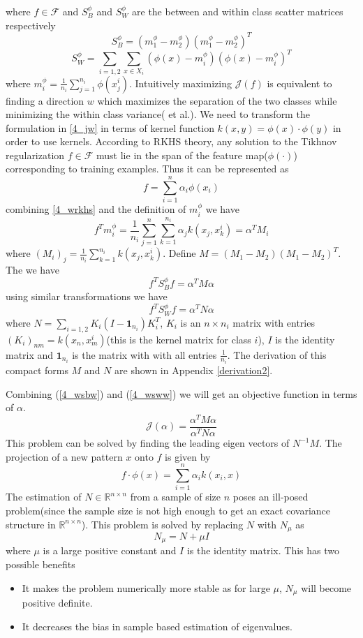 where $f \in \mathcal{F}$ and $S_B^{\phi}$ and $S_W^{\phi}$ are the between and within class scatter matrices respectively
\[ S_B^{\phi} = (m_1^{\phi} - m_2^{\phi})(m_1^{\phi} - m_2^{\phi})^T \]
\[ S_W^{\phi} = \sum_{i=1,2}\sum_{x \in X_i} (\phi(x)-m_i^{\phi})(\phi(x)-m_i^{\phi})^T  \]
where $m_i^{\phi} = \frac{1}{n_i} \sum_{j=1}^{n_i} \phi(x_j^i)$. Intuitively maximizing $\mathcal{J}(f)$ is equivalent to finding a direction $w$ which maximizes the separation of the two classes while minimizing the within class variance(\cite{kfda} et al.). We need to transform the formulation in \ref{4_jw} in terms of kernel function $k(x, y) = \phi(x) \cdot \phi(y)$ in order to use kernels. According to RKHS theory, any solution to the Tikhnov regularization $f \in \mathcal{F}$ must lie in the span of the feature map($\phi(\cdot)$) corresponding to training examples. Thus it can be represented as
\begin{equation}
f = \sum_{i=1}^n \alpha_i \phi(x_i)
\label{4_wrkhs}
\end{equation}
combining \ref{4_wrkhs} and the definition of $m_i^{\phi}$ we have
\[ f^Tm_i^{\phi} = \frac{1}{n_i} \sum_{j=1}^n \sum_{k=1}^{n_i} \alpha_j k(x_j, x_k^i) = \alpha^T M_i \]
where $(M_i)_j = \frac{1}{n_i} \sum_{k=1}^{n_i}  k(x_j, x_k^i)$. Define $M = (M_1-M_2)(M_1-M_2)^T$. The we have
\begin{equation}
f^T S_B^{\phi} f = \alpha^T M \alpha
\label{4_wsbw}
\end{equation}
using similar transformations we have
\begin{equation}
f^T S_W^{\phi} f = \alpha^T N \alpha
\label{4_wsww}
\end{equation}
where $N = \sum_{i=1,2} K_i(I - \bm{1}_{n_i})K_i^T $, $K_i$ is an $n \times n_i$ matrix with entries $(K_i)_{nm} = k(x_n, x_m^i)$(this is the kernel matrix for class $i$), $I$ is the identity matrix and $\bm{1}_{n_i}$ is the matrix with with all entries $\frac{1}{n_i}$. The derivation of this compact forms $M$ and $N$ are shown in Appendix \ref{derivation2}.

Combining (\ref{4_wsbw}) and (\ref{4_wsww}) we will get an objective function in terms of $\alpha$.
\[ \mathcal{J}(\alpha) = \frac{\alpha^T M \alpha}{\alpha^T N \alpha}  \]
This problem can be solved by finding the leading eigen vectors of $N^{-1}M$. The projection of a new pattern $x$ onto $f$ is given by
\[ f \cdot \phi(x) = \sum_{i=1}^n \alpha_i k(x_i, x) \]
The estimation of $N \in \mathbb{R}^{n \times n}$ from a sample of size $n$ poses an ill-posed problem(since the sample size is not high enough to get an exact covariance structure in $\mathbb{R}^{n \times n}$). This problem is solved by replacing $N$ with $N_{\mu}$ as
\[ N_{\mu} = N + \mu I \]
where $\mu$ is a large positive constant and $I$ is the identity matrix. This has two possible benefits
\begin{itemize}
\item It makes the problem numerically more stable as for large $\mu$, $N_{\mu}$ will become positive definite.
\item It decreases the bias in sample based estimation of eigenvalues.
\end{itemize}


